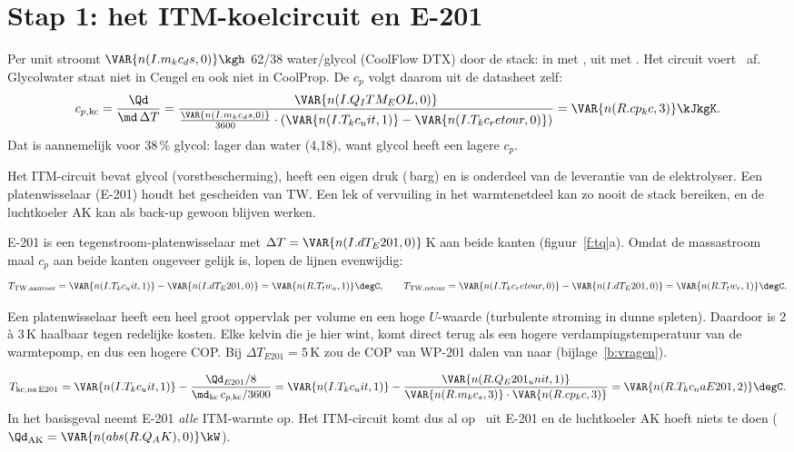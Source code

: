 \section{Stap 1: het ITM-koelcircuit en E-201}
Per unit stroomt $\VAR{n(I.m_kc_ds,0)}\kgh$ 62/38 water/glycol (CoolFlow DTX) door de stack: in met
\degC, uit met \degC. Het circuit voert \kW\ af.
Glycolwater staat niet in Cengel en ook niet in CoolProp. De $c_p$ volgt daarom uit de datasheet zelf:
\[
c_{p,\mathrm{kc}} = \frac{\Qd}{\md\,\Delta T} = \frac{\VAR{n(I.Q_ITM_EOL,0)}}{\frac{\VAR{n(I.m_kc_ds,0)}}{3600}\cdot(\VAR{n(I.T_kc_uit,1)} - \VAR{n(I.T_kc_retour,0)})} = \VAR{n(R.cp_kc,3)}\kJkgK .
\]
Dat is aannemelijk voor 38\,\% glycol: lager dan water (4,18), want glycol heeft een lagere $c_p$.
\begin{waarom}
Het ITM-circuit bevat glycol (vorstbescherming), heeft een eigen druk (\,barg) en is onderdeel van de
leverantie van de elektrolyser. Een platenwisselaar (E-201) houdt het gescheiden van TW. Een lek of vervuiling in het
warmtenetdeel kan zo nooit de stack bereiken, en de luchtkoeler AK kan als back-up gewoon blijven werken.
\end{waarom}
E-201 is een tegenstroom-platenwisselaar met $\Delta T = \VAR{n(I.dT_E201,0)}$\,K aan beide kanten
(figuur~\ref{f:tq}a). Omdat de massastroom maal $c_p$ aan beide kanten ongeveer gelijk is, lopen de lijnen evenwijdig:
\[
T_{\mathrm{TW},\mathrm{aanvoer}} = \VAR{n(I.T_kc_uit,1)} - \VAR{n(I.dT_E201,0)} = \VAR{n(R.T_tw_a,1)}\degC,\qquad
T_{\mathrm{TW},\mathrm{retour}} = \VAR{n(I.T_kc_retour,0)} - \VAR{n(I.dT_E201,0)} = \VAR{n(R.T_tw_r,1)}\degC .
\]
\begin{waarom}
Een platenwisselaar heeft een heel groot oppervlak per volume en een hoge $U$-waarde (turbulente stroming in dunne
spleten). Daardoor is 2 à 3\,K haalbaar tegen redelijke kosten. Elke kelvin die je hier wint, komt direct terug als
een hogere verdampingstemperatuur van de warmtepomp, en dus een hogere COP. Bij $\Delta T_{E201} = 5$\,K zou de COP van
WP-201 dalen van  naar  (bijlage~\ref{b:vragen}).
\end{waarom}
\[
T_\mathrm{kc,na\,E201} = \VAR{n(I.T_kc_uit,1)} - \frac{\Qd_{E201}/8}{\md_\mathrm{kc}\,c_{p,\mathrm{kc}}/3600}
= \VAR{n(I.T_kc_uit,1)} - \frac{\VAR{n(R.Q_E201_unit,1)}}{\VAR{n(R.m_kc_s,3)}\cdot\VAR{n(R.cp_kc,3)}} = \VAR{n(R.T_kc_naE201,2)}\degC .
\]
In het basisgeval neemt E-201 \emph{alle} ITM-warmte op. Het ITM-circuit komt dus al op \degC\ uit E-201 en
de luchtkoeler AK hoeft niets te doen ($\Qd_\mathrm{AK} = \VAR{n(abs(R.Q_AK),0)}\kW$).


